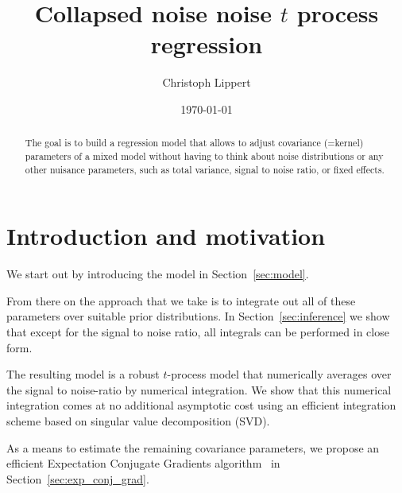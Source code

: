 \documentclass[twoside]{article}
\begin{document}
\date{\today}

\title{Collapsed noise noise $t$ process regression}
\author{Christoph Lippert}


\maketitle

\begin{abstract}
The goal is to build a regression model that allows to adjust covariance (=kernel) parameters of a mixed model without having to think about noise distributions or any other nuisance parameters, such as total variance, signal to noise ratio, or fixed effects.
\end{abstract}

\section{Introduction and motivation}

We start out by introducing the model in Section~\ref{sec:model}.

From there on the approach that we take is to integrate out all of these parameters over suitable prior distributions.
In Section~\ref{sec:inference} we show that except for the signal to noise ratio, all integrals can be performed in close form.

The resulting model is a robust $t$-process model that numerically averages over the signal to noise-ratio by numerical integration. We show that this numerical integration comes at no additional asymptotic cost using an efficient integration scheme based on singular value decomposition (SVD).

As a means to estimate the remaining covariance parameters, we propose an efficient Expectation Conjugate Gradients algorithm~\cite{salakhutdinov2003optimization} in Section~\ref{sec:exp_conj_grad}.
\end{document}
